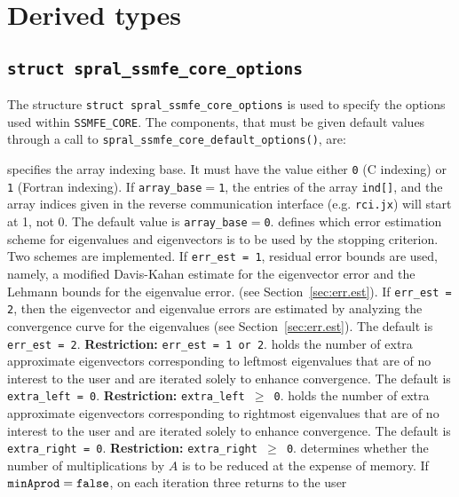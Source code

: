 \section{Derived types}
\subsection{\texttt{struct spral\_ssmfe\_core\_options}} \label{ssmfe:type:options}

The structure {\tt struct spral\_ssmfe\_core\_options} is used to specify
the options used within {\tt SSMFE\_CORE}. The components, that must be given
default values through a call to \texttt{spral\_ssmfe\_core\_default\_options()}, are:

\begin{description}
%
 specifies the array indexing base. It must
   have the value either \texttt{0} (C indexing) or \texttt{1} (Fortran
   indexing). If \texttt{array\_base}$=$\texttt{1}, the entries of the array
   \texttt{ind[]}, and the array indices given in the reverse communication
   interface (e.g. \texttt{rci.jx}) will start at 1, not 0.
   The default value is \texttt{array\_base}$=$\texttt{0}.
%
defines which error estimation scheme 
for eigenvalues and eigenvectors
is to be used by the stopping criterion.
Two schemes are implemented.
If {\tt err\_est = 1}, residual error bounds are used,
namely,
a modified Davis-Kahan estimate for the eigenvector error
and
the Lehmann bounds for the eigenvalue error.
(see Section~\ref{sec:err.est}).
If {\tt err\_est = 2}, 
then the eigenvector and eigenvalue errors
are estimated by analyzing the convergence curve
for the eigenvalues (see Section~\ref{sec:err.est}).
The default is {\tt err\_est = 2}.
{\bf Restriction:} {\tt err\_est = 1 {\rm or} 2}.
%
holds the number of extra approximate eigenvectors
corresponding to leftmost eigenvalues
that are of no interest to the user
and are iterated solely to enhance convergence.
The default is {\tt extra\_left = 0}.
{\bf Restriction:} {\tt extra\_left $\ge$ 0}.
%
holds the number of extra approximate eigenvectors
corresponding to rightmost eigenvalues
that are of no interest to the user
and are iterated solely to enhance convergence.
The default is {\tt extra\_right = 0}.
{\bf Restriction:} {\tt extra\_right $\ge$ 0}.
%
determines whether the number of multiplications by $A$ 
is to be reduced at the expense of memory. 
If ${\tt minAprod = false}$, 
on each iteration three returns to the user

\end{description}
